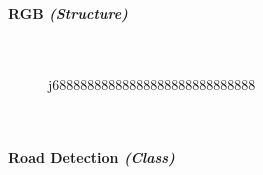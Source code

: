 \begin{FlushLeft}
\begin{enumerate}
    \paragraph*{RGB \textit{(Structure)}} \mbox{} \\

    \begin{figure}[H]j68888888888888888888888888888
        \centering
    \end{figure}\\

    \bk

    \paragraph*{Road Detection \textit{(Class)}} \mbox{} \\

    \begin{figure}[H]
        \centering
    \end{figure}\\


\end{enumerate}
\end{FlushLeft}
